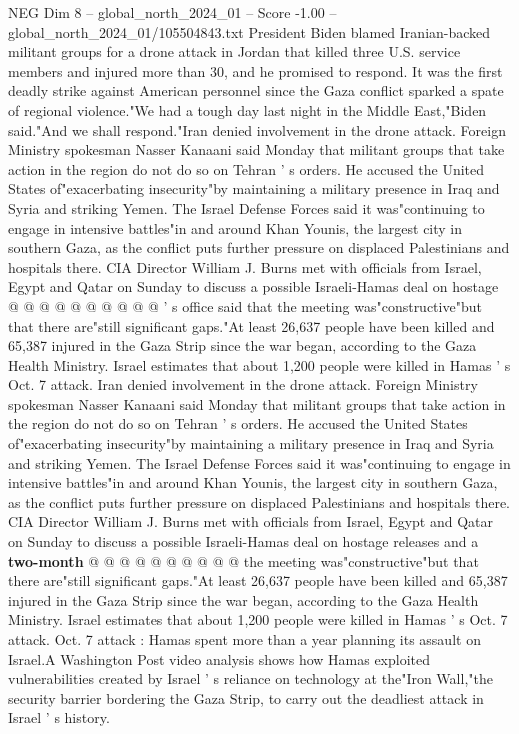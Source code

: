 \begin{textsample}{NEG Dim 8 – global\_north\_2024\_01 – Score -1.00 – global\_north\_2024\_01/105504843.txt}  \label{ex:f8_neg_277}
President Biden blamed Iranian-backed militant groups for a drone attack in Jordan that killed three U.S. service members and injured more than 30, and he promised to respond.
It was the first deadly strike against American personnel since the Gaza conflict sparked a spate of regional violence."We had a tough day last night in the Middle East,"Biden said."And we shall respond."Iran denied involvement in the drone attack.
Foreign Ministry spokesman Nasser Kanaani said Monday that militant groups that take action in the region do not do so on Tehran ' s orders.
He accused the United States of"exacerbating insecurity"by maintaining a military presence in Iraq and Syria and striking Yemen.
The Israel Defense Forces said it was"continuing to engage in intensive battles"in and around Khan Younis, the largest city in southern Gaza, as the conflict puts further pressure on displaced Palestinians and hospitals there.
CIA Director William J.
Burns met with officials from Israel, Egypt and Qatar on Sunday to discuss a possible Israeli-Hamas deal on hostage @ @ @ @ @ @ @ @ @ @ ' s office said that the meeting was"constructive"but that there are"still significant gaps."At least 26,637 people have been killed and 65,387 injured in the Gaza Strip since the war began, according to the Gaza Health Ministry.
Israel estimates that about 1,200 people were killed in Hamas ' s Oct. 7 attack.
Iran denied involvement in the drone attack.
Foreign Ministry spokesman Nasser Kanaani said Monday that militant groups that take action in the region do not do so on Tehran ' s orders.
He accused the United States of"exacerbating insecurity"by maintaining a military presence in Iraq and Syria and striking Yemen.
The Israel Defense Forces said it was"continuing to engage in intensive battles"in and around Khan Younis, the largest city in southern Gaza, as the conflict puts further pressure on displaced Palestinians and hospitals there.
CIA Director William J.
Burns met with officials from Israel, Egypt and Qatar on Sunday to discuss a possible Israeli-Hamas deal on hostage releases and a \textbf{two-month} @ @ @ @ @ @ @ @ @ @ the meeting was"constructive"but that there are"still significant gaps."At least 26,637 people have been killed and 65,387 injured in the Gaza Strip since the war began, according to the Gaza Health Ministry.
Israel estimates that about 1,200 people were killed in Hamas ' s Oct. 7 attack.
Oct. 7 attack : Hamas spent more than a year planning its assault on Israel.A Washington Post video analysis shows how Hamas exploited vulnerabilities created by Israel ' s reliance on technology at the"Iron Wall,"the security barrier bordering the Gaza Strip, to carry out the deadliest attack in Israel ' s history.

\end{textsample}
